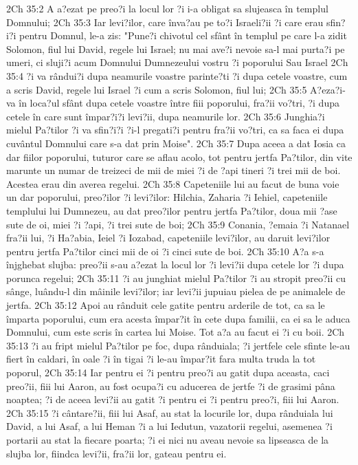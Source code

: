 2Ch 35:2  A a?ezat pe preo?i la locul lor ?i i-a obligat sa slujeasca în templul Domnului;
2Ch 35:3  Iar levi?ilor, care înva?au pe to?i Israeli?ii ?i care erau sfin?i?i pentru Domnul, le-a zis: "Pune?i chivotul cel sfânt în templul pe care l-a zidit Solomon, fiul lui David, regele lui Israel; nu mai ave?i nevoie sa-l mai purta?i pe umeri, ci sluji?i acum Domnului Dumnezeului vostru ?i poporului Sau Israel
2Ch 35:4  ?i va rândui?i dupa neamurile voastre parinte?ti ?i dupa cetele voastre, cum a scris David, regele lui Israel ?i cum a scris Solomon, fiul lui;
2Ch 35:5  A?eza?i-va în loca?ul sfânt dupa cetele voastre între fiii poporului, fra?ii vo?tri, ?i dupa cetele în care sunt împar?i?i levi?ii, dupa neamurile lor.
2Ch 35:6  Junghia?i mielul Pa?tilor ?i va sfin?i?i ?i-l pregati?i pentru fra?ii vo?tri, ca sa faca ei dupa cuvântul Domnului care s-a dat prin Moise".
2Ch 35:7  Dupa aceea a dat Iosia ca dar fiilor poporului, tuturor care se aflau acolo, tot pentru jertfa Pa?tilor, din vite marunte un numar de treizeci de mii de miei ?i de ?api tineri ?i trei mii de boi. Acestea erau din averea regelui.
2Ch 35:8  Capeteniile lui au facut de buna voie un dar poporului, preo?ilor ?i levi?ilor: Hilchia, Zaharia ?i Iehiel, capeteniile templului lui Dumnezeu, au dat preo?ilor pentru jertfa Pa?tilor, doua mii ?ase sute de oi, miei ?i ?api, ?i trei sute de boi;
2Ch 35:9  Conania, ?emaia ?i Natanael fra?ii lui, ?i Ha?abia, Ieiel ?i Iozabad, capeteniile levi?ilor, au daruit levi?ilor pentru jertfa Pa?tilor cinci mii de oi ?i cinci sute de boi.
2Ch 35:10  A?a s-a înjghebat slujba: preo?ii s-au a?ezat la locul lor ?i levi?ii dupa cetele lor ?i dupa porunca regelui;
2Ch 35:11  ?i au junghiat mielul Pa?tilor ?i au stropit preo?ii cu sânge, luându-l din mâinile levi?ilor; iar levi?ii jupuiau pielea de pe animalele de jertfa.
2Ch 35:12  Apoi au rânduit cele gatite pentru arderile de tot, ca sa le împarta poporului, cum era acesta împar?it în cete dupa familii, ca ei sa le aduca Domnului, cum este scris în cartea lui Moise. Tot a?a au facut ei ?i cu boii.
2Ch 35:13  ?i au fript mielul Pa?tilor pe foc, dupa rânduiala; ?i jertfele cele sfinte le-au fiert în caldari, în oale ?i în tigai ?i le-au împar?it fara multa truda la tot poporul,
2Ch 35:14  Iar pentru ei ?i pentru preo?i au gatit dupa aceasta, caci preo?ii, fiii lui Aaron, au fost ocupa?i cu aducerea de jertfe ?i de grasimi pâna noaptea; ?i de aceea levi?ii au gatit ?i pentru ei ?i pentru preo?i, fiii lui Aaron.
2Ch 35:15  ?i cântare?ii, fiii lui Asaf, au stat la locurile lor, dupa rânduiala lui David, a lui Asaf, a lui Heman ?i a lui Iedutun, vazatorii regelui, asemenea ?i portarii au stat la fiecare poarta; ?i ei nici nu aveau nevoie sa lipseasca de la slujba lor, fiindca levi?ii, fra?ii lor, gateau pentru ei.
